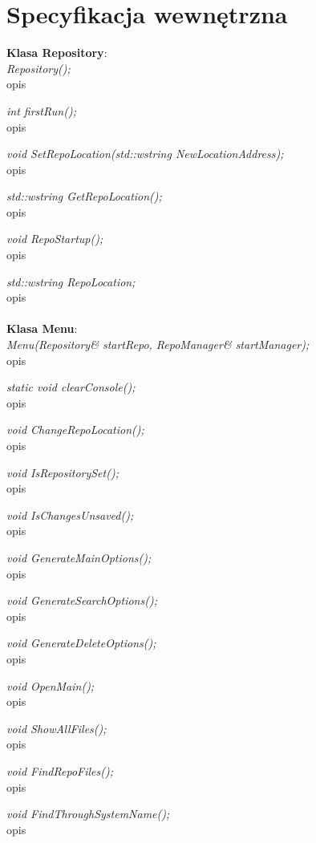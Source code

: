 \documentclass[10pt, a4paper]{article}
\begin{document}
\section{Specyfikacja wewnętrzna}
\textbf{Klasa Repository}:\\

\textit{Repository();}\\
opis


\textit{int firstRun();}\\
opis

\textit{void SetRepoLocation(std::wstring NewLocationAddress);}\\
opis

\textit{std::wstring GetRepoLocation();}\\
opis

\textit{void RepoStartup();}\\
opis

\textit{std::wstring RepoLocation;}\\
opis
\\\\
\textbf{Klasa Menu}:\\

\textit{Menu(Repository& startRepo, RepoManager& startManager);}\\
opis

\textit{static void clearConsole();}\\
opis

\textit{void ChangeRepoLocation();}\\
opis

\textit{void IsRepositorySet();}\\
opis

\textit{void IsChangesUnsaved();}\\
opis

\textit{void GenerateMainOptions();}\\
opis

\textit{void GenerateSearchOptions();}\\
opis

\textit{void GenerateDeleteOptions();}\\
opis

\textit{void OpenMain();}\\
opis

\textit{void ShowAllFiles();}\\
opis

\textit{void FindRepoFiles();}\\
opis

\textit{void FindThroughSystemName();}\\
opis
\end{document}
